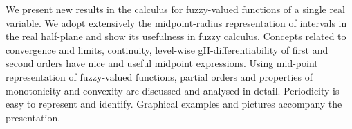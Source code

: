 

	We present new results in the calculus for fuzzy-valued functions of a
	single real variable. We adopt extensively the midpoint-radius
	representation of intervals in the real half-plane and show its usefulness
	in fuzzy calculus. Concepts related to convergence and limits, continuity,
	level-wise gH-differentiability of first and second orders have nice and useful midpoint expressions.
	Using mid-point representation of fuzzy-valued functions, partial orders and properties of monotonicity and convexity are discussed and analysed in detail.  Periodicity is easy to represent and identify. Graphical examples and pictures accompany the presentation. 



